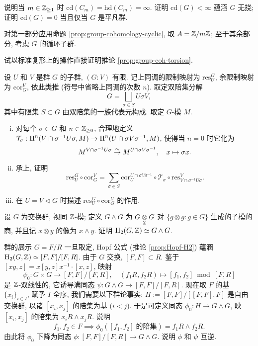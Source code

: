 \begin{Exercises}
	\item 说明当 $m \in \mathbb{Z}_{\geq 1}$ 时 $\mathrm{cd}(C_m) = \mathrm{hd}(C_m) = \infty$. 证明 $\mathrm{cd}(G) < \infty$ 蕴涵 $G$ 无挠; 证明 $\mathrm{cd}(G) = 0$ 当且仅当 $G$ 是平凡群.
	\begin{hint}
		对第一部分应用命题 \ref{prop:group-cohomology-cyclic}, 取 $A = \mathbb{Z}/m\mathbb{Z}$; 至于其余部分, 考虑 $G$ 的循环子群.
	\end{hint}

	\item 试以标准复形上的操作直接证明推论 \ref{prop:group-coh-torsion}.

	\item 设 $U$ 和 $V$ 是群 $G$ 的子群, $(G:V)$ 有限. 记上同调的限制映射为 $\mathrm{res}^G_U$, 余限制映射为 $\mathrm{cor}^V_G$, 依此类推 (符号中省略上同调的次数 $n$). 取定双陪集分解
	\[ G = \bigsqcup_{\sigma \in S} U \sigma V, \]
	其中有限集 $S \subset G$ 由双陪集的一族代表元构成. 取定 $G$-模 $M$.
	\begin{enumerate}[(i)]
		\item 对每个 $\sigma \in G$ 和 $n \in \mathbb{Z}_{\geq 0}$, 合理地定义 $\mathcal{T}_\sigma: \operatorname{H}^n(V \cap \sigma^{-1} U \sigma, M) \to \operatorname{H}^n(U \cap \sigma V \sigma^{-1}, M)$, 使得当 $n=0$ 时它化为
		\[ M^{V \cap \sigma^{-1} U \sigma} \stackrel{\sim}{\rightarrow} M^{U \cap \sigma V \sigma^{-1}}, \quad x \mapsto \sigma x. \]
		\item 承上, 证明
		\[ \mathrm{res}^G_U \circ \mathrm{cor}^V_G = \sum_{\sigma \in S} \mathrm{cor}^{U \cap \sigma V \sigma^{-1}}_U \circ \mathcal{T}_\sigma \circ \mathrm{res}^V_{V \cap \sigma^{-1} U \sigma}. \]
		\item 在 $U = V \lhd G$ 时描述 $\mathrm{res}^G_U \circ \mathrm{cor}^U_G$ 的作用.
	\end{enumerate}
	
	\item 设 $G$ 为交换群, 视同 $\mathbb{Z}$-模; 定义 $G \wedge G$ 为 $G \underset{\mathbb{Z}}{\otimes} G$ 对 $\{g \otimes g : g \in G \}$ 生成的子模的商, 并且记 $x \otimes y$ 的像为 $x \wedge y$. 证明 $\operatorname{H}_2(G, \mathbb{Z}) \simeq G \wedge G$.
	
	\begin{hint}
		\index[sym1]{[,]}
		群的展示 $G = F/R$ 一旦取定, Hopf 公式 (推论 \ref{prop:Hopf-H2}) 蕴涵 $\operatorname{H}_2(G, \mathbb{Z}) \simeq [F, F]/[F, R]$. 由于 $G$ 交换, $[F, F] \subset R$. 鉴于 $[xy, z] = x[y, z]x^{-1} \cdot [x, z]$, 映射
		\[ \psi_0: G \times G \to [F, F]/[F, R], \quad (f_1 R, f_2 R) \mapsto [f_1, f_2] \bmod [F, R] \]
		是 $\mathbb{Z}$-双线性的, 它诱导满同态 $\psi: G \wedge G \to [F, F]/[F, R]$. 现在取 $F$ 的基 $\{x_i\}_{i \in I}$, 赋予 $I$ 全序, 我们需要以下群论事实: $H := [F, F]/[[F, F], F]$ 是自由交换群, 以诸 $[x_i, x_j]$ 的陪集为基 ($i < j$). 于是可定义同态 $\phi_0: H \to G \wedge G$, 映 $[x_i, x_j]$ 的陪集为 $x_i R \wedge x_j R$. 说明
		\[ f_1, f_2 \in F \implies \phi_0([f_1, f_2] \;\text{的陪集}) = f_1 R \wedge f_2 R. \]
		由此将 $\phi_0$ 下降为同态 $\phi: [F, F]/[F, R] \to G \wedge G$. 说明 $\phi$ 和 $\psi$ 互逆.


\end{hint}
\end{Exercises}
